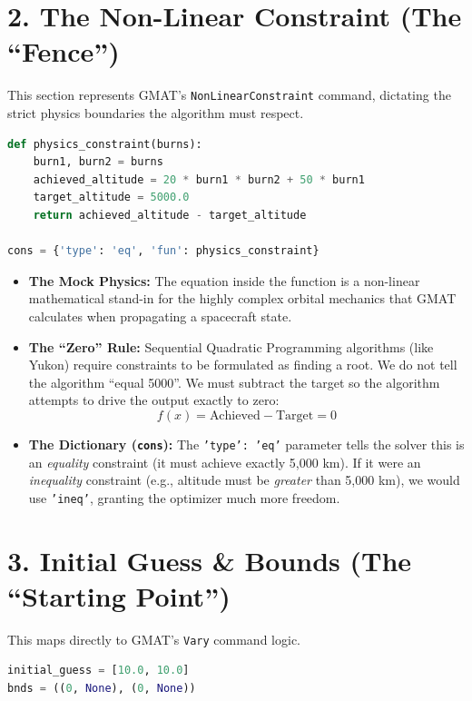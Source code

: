 \documentclass[11pt, letterpaper]{article}
\begin{document}
\section*{2. The Non-Linear Constraint (The ``Fence'')}

This section represents GMAT's \texttt{NonLinearConstraint} command, dictating the strict physics boundaries the algorithm must respect.

\begin{lstlisting}[language=Python]
def physics_constraint(burns):
    burn1, burn2 = burns
    achieved_altitude = 20 * burn1 * burn2 + 50 * burn1
    target_altitude = 5000.0
    return achieved_altitude - target_altitude

cons = {'type': 'eq', 'fun': physics_constraint}
\end{lstlisting}

\begin{itemize}
    \item \textbf{The Mock Physics:} The equation inside the function is a non-linear mathematical stand-in for the highly complex orbital mechanics that GMAT calculates when propagating a spacecraft state.
    \item \textbf{The ``Zero'' Rule:} Sequential Quadratic Programming algorithms (like Yukon) require constraints to be formulated as finding a root. We do not tell the algorithm ``equal 5000''. We must subtract the target so the algorithm attempts to drive the output exactly to zero: 
    $$f(x) = \text{Achieved} - \text{Target} = 0$$
    \item \textbf{The Dictionary (\texttt{cons}):} The \texttt{'type': 'eq'} parameter tells the solver this is an \textit{equality} constraint (it must achieve exactly 5,000 km). If it were an \textit{inequality} constraint (e.g., altitude must be \textit{greater} than 5,000 km), we would use \texttt{'ineq'}, granting the optimizer much more freedom.
\end{itemize}

\section*{3. Initial Guess \& Bounds (The ``Starting Point'')}

This maps directly to GMAT's \texttt{Vary} command logic.

\begin{lstlisting}[language=Python]
initial_guess = [10.0, 10.0]
bnds = ((0, None), (0, None))
\end{lstlisting}
\end{document}
